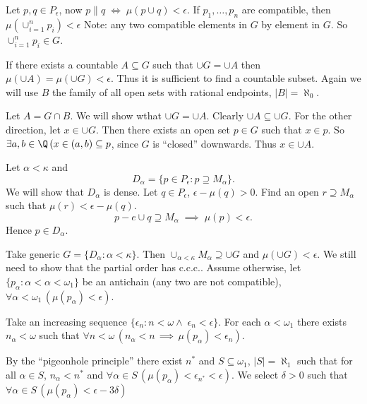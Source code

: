 \documentclass[11pt,pdftex,twoside,a4paper]{article}
\newcommand{\ccc}{c.c.c.}
\begin{document}
Let \(p,q\in P_\epsilon\), now \(p\| q\;\iff\; \mu(p\cup q)<\epsilon\).
If \(p_1,\ldots,p_n\) are compatible, then \(\mu(\cup_{i=1}^n p_i) < \epsilon\)
Note: any two compatible elements in $G$ by element in $G$.
So \(\cup_{i=1}^n p_i \in G\).

If there exists a countable \(A \subseteq G\) such that
\(\cup G = \cup A\) then \(\mu(\cup A) = \mu(\cup G) < \epsilon\).
Thus it is sufficient to find a countable subset.
Again we will use $B$ the family of all open sets with rational endpoints,
\(|B|=\aleph_0\).

Let \(A = G \cap B\). We will show wthat \(\cup G = \cup A\).
Clearly \(\cup A \subseteq \cup G\).
For the other direction, let \(x\in\cup G\).
Then there exists an open set \(p\in G\) such that \(x\in p\).
So \(\exists a,b\in\Q\,(x\in (a,b)\subseteq p\),
since $G$ is ``closed'' downwards. Thus \(x\in \cup A\).

Let \(\alpha<\kappa\) and 
\begin{equation*}
D_\alpha = \{p \in P_\epsilon : p \supseteq M_\alpha\}.
\end{equation*}
We will show that \(D_\alpha\) is dense.
Let \(q\in P_\epsilon\), \(\epsilon - \mu(q) > 0\).
Find an open \(r \supseteq M_\alpha\) such that \(\mu(r) < \epsilon - \mu(q)\).
\begin{equation*}
p - e \cup q \supseteq M_\alpha\;\implies\;\mu(p)<\epsilon.
\end{equation*}
Hence \(p\in D_\alpha\).

Take generic \(G = \{D_\alpha: \alpha < \kappa\}\).
Then \(\cup_{\alpha<\kappa}M_\alpha \supseteq \cup G\)
and \(\mu(\cup G)<\epsilon\).
We still need to show that the partial order has \ccc.
Assume otherwise, let \(\{p_\alpha: \alpha < \alpha < \omega_1\}\)
be an antichain (any two are not compatible),
\(\forall \alpha<\omega_1\,(\mu(p_\alpha)<\epsilon)\).

Take an increasing sequence
 \(\{\epsilon_n: n < \omega\land\; \epsilon_n<\epsilon\}\).
For each \(\alpha<\omega_1\) there exists \(n_\alpha<\omega\) 
such that 
 \(\forall n<\omega\,(n_\alpha<n\,\implies\,\mu(p_\alpha)<\epsilon_n)\).

By the ``pigeonhole principle'' there exist \(n^*\) and \(S\subseteq \omega_1\),
\(|S|=\aleph_1\) such that for all \(\alpha \in S\), \(n_\alpha<n^*\)
and \(\forall \alpha\in S\,(\mu(p_\alpha)<\epsilon_{n^*} < \epsilon)\).
We select \(\delta>0\)  such that 
\(\forall\alpha\in S\,(\mu(p_\alpha) < \epsilon - 3\delta)\)
\end{document}
